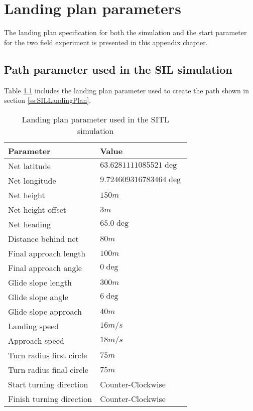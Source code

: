 \chapter{Landing plan parameters}
The landing plan specification for both the simulation and the start parameter for the two field experiment is presented in this appendix chapter.
\section{Path parameter used in the SIL simulation}\label{AP:SpecSIL}
Table \ref{AP:TB:landingSITL} includes the landing plan parameter used to create the path shown in section \ref{ss:SILLandingPlan}.
\newpage
\begin{table}[H]
\centering
\begin{tabular}{| p{4cm} | p{4cm} |}
\hline
\textbf{Parameter}			& \textbf{Value}			\\ \hline
Net latitude				& $63.6281111085521 \deg$ 	\\ \hline
Net longitude				& $9.724609316783464 \deg$ 	\\ \hline
Net height					& $150 m$					\\ \hline
Net height offset			& $3 m$ 	\\ \hline
Net heading					& $65.0 \deg$				\\ \hline
Distance behind net			& $80 m$					\\ \hline
Final approach length		& $100 m$					\\ \hline
Final approach angle		& $0 \deg$					\\ \hline
Glide slope length			& $300 m $					\\ \hline
Glide slope angle			& $6 \deg$					\\ \hline
Glide slope approach		& $40 m$					\\ \hline
Landing speed				& $16 m/s$					\\ \hline
Approach speed				& $18 m/s$					\\ \hline
Turn radius first circle	& $75 m$					\\ \hline
Turn radius final circle	& $75 m$					\\ \hline
Start turning direction		& Counter-Clockwise			\\ \hline
Finish turning direction	& Counter-Clockwise			\\ \hline
\end{tabular}
\caption{Landing plan parameter used in the SITL simulation}
\label{AP:TB:landingSITL}
\end{table}
